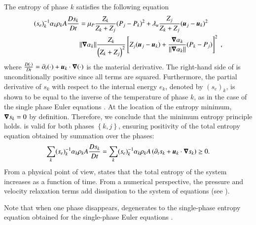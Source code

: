 \documentclass[preprint,10pt]{elsarticle}
\begin{document}
The entropy of phase $k$ satisfies the following equation
%
\begin{align} \label{eq:ent-eqn-7-eqn-model}
(s_{e})_k^{-1} \alpha_k \rho_k A \frac{Ds_k}{Dt} &= \mu_P \frac{Z_k}{Z_k+Z_j} (P_j - P_k)^2 + \lambda_u \frac{Z_j}{Z_k+Z_j} (\boldsymbol u_j -\boldsymbol u_k)^2 \nonumber
\\
& \| \boldsymbol\nabla \alpha_k \| \frac{Z_k}{\left( Z_k+Z_j \right)^2} \left[ Z_j (\boldsymbol u_j-\boldsymbol u_k)+\frac{\boldsymbol\nabla \alpha_k}{\| \boldsymbol\nabla \alpha_k \|}(P_k-P_j)\right]^2 \ ,
\end{align}
%
where $\frac{D(\cdot) }{Dt} = \partial_t (\cdot) + \boldsymbol u_k \cdot \boldsymbol\nabla (\cdot)$ is the material derivative.
The right-hand side of  is unconditionally positive since all terms are squared. Furthermore, 
the partial derivative of $s_k$ with respect to the internal energy $e_k$, denoted by $(s_e)_k$, is shown to be equal to the inverse of the temperature 
of phase $k$, as in the case of the single phase Euler equations \cite{jlg, Marco_dissertation}. At the location of the entropy minimum, $\boldsymbol\nabla s_k =0$ 
by definition. Therefore, we conclude  that the minimum entropy principle holds.
%
%
 is valid for both phases $\left\{k, j\right\}$, ensuring positivity of the total entropy equation obtained by summation over the phases:
%
\begin{equation}\label{eq:tot-ent-res-sct4}
\sum_k (s_{e})_k^{-1} \alpha_k \rho_k A \frac{Ds_k}{Dt} = \sum_k (s_{e})_k^{-1} \alpha_k \rho_k A \left( \partial_t s_k + \boldsymbol u_k \cdot \boldsymbol\nabla s_k \right) \geq 0  .
\end{equation}
%
From a physical point of view,  states that the total entropy of the system increases as a function of time. From a numerical perspective, 
the pressure and velocity relaxation terms add dissipation to the system of equations (see ).

Note that when one phase disappears,  degenerates to the single-phase entropy equation obtained for the single-phase Euler equations \cite{SEM, Marco_dissertation}.

\end{document}
